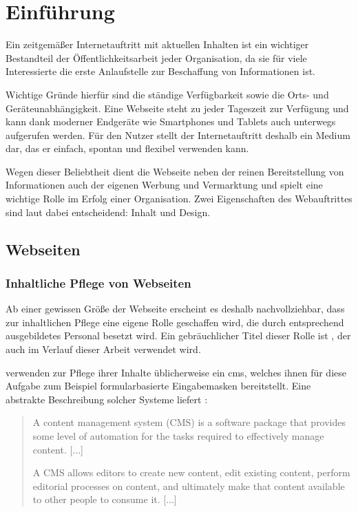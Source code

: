 \chapter{Einführung}
    \label{chapter:introduction}
    Ein zeitgemäßer Internetauftritt mit aktuellen Inhalten
    ist ein wichtiger Bestandteil der Öffentlichkeitsarbeit jeder Organisation,
    da sie für viele Interessierte die erste Anlaufstelle zur Beschaffung von Informationen ist.

    Wichtige Gründe hierfür sind die ständige Verfügbarkeit sowie die Orts-
    und Geräteunabhängigkeit.
    Eine Webseite steht zu jeder Tageszeit zur Verfügung und kann
    dank moderner Endgeräte wie Smartphones und Tablets
    auch unterwegs aufgerufen werden.
    Für den Nutzer stellt der Internetauftritt deshalb ein Medium dar,
    das er einfach, spontan und flexibel verwenden kann.

    Wegen dieser Beliebtheit dient die Webseite neben der reinen Bereitstellung von Informationen
    auch der eigenen Werbung und Vermarktung und spielt eine wichtige Rolle im Erfolg einer Organisation.
    Zwei Eigenschaften des Webauftrittes sind laut \cite{sillence:onlineHealthSites} dabei
    entscheidend: Inhalt und Design.
    
    \section{Webseiten}

        \subsection{Inhaltliche Pflege von Webseiten}
            Ab einer gewissen Größe der Webseite erscheint es deshalb nachvollziehbar,
            dass zur inhaltlichen Pflege eine eigene Rolle geschaffen wird,
            die durch entsprechend ausgebildetes Personal besetzt wird.
            Ein gebräuchlicher Titel dieser Rolle ist \textit{\editor},
            der auch im Verlauf dieser Arbeit verwendet wird.

            \editors verwenden zur Pflege ihrer Inhalte üblicherweise ein \gls{cms},
            welches ihnen für diese Aufgabe zum Beispiel formularbasierte Eingabemasken bereitstellt.
            Eine abstrakte Beschreibung solcher Systeme liefert \cite[][Seite 5,6]{barker:webCMS}:

            \begin{quote}
                A content management system (CMS) is a software package that provides
                some level of automation for the tasks required to effectively manage content.
                [...]

                A CMS allows editors to create new content, edit existing content,
                perform editorial processes on content, and ultimately make that content
                available to other people to consume it.
                [...]
            \end{quote}


